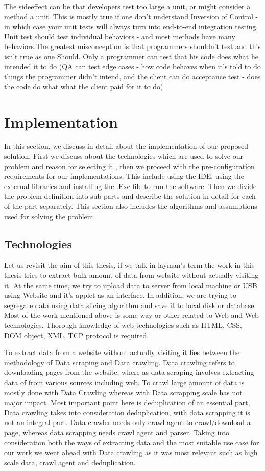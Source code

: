 \documentclass[article,type=msc,colorback,accentcolor=tud9c,twoside,11pt]{tudthesis}
\begin{document}
The sideeffect can be that developers test too large a unit, or might consider a method a unit. This is mostly true if one don't understand Inversion of Control - in which case your unit tests will always turn into end-to-end integration testing. Unit test should test individual behaviors - and most methods have many behaviors.The greatest misconception is that programmers shouldn't test and this isn't true as one Should. Only a programmer can test that his code does what he intended it to do (QA can test edge cases - how code behaves when it's told to do things the programmer didn't intend, and the client can do acceptance test - does the code do what what the client paid for it to do)


\clearpage

\section{Implementation}
In this section, we discuss in detail about the implementation of our proposed solution. First we discuss about the technologies which are used to solve our problem and reason for selecting it , then we proceed with the pre-configuration requirements for our implementations. This include using the IDE, using the external libraries and installing the .Exe file to run the software. Then we divide the problem definition into sub parts and describe the solution in detail for each of the part separately. This section also includes the algorithms and assumptions used for solving the problem.

\subsection{Technologies}
Let us revisit the aim of this thesis, if we talk in layman's term the work in this thesis tries to extract bulk amount of data from website without actually visiting it. At the same time, we try to upload data to server from local machine or USB using Website and it's applet as an interface. In addition, we are trying to segregate data using data slicing algorithm and save it to local disk or database. Most of the work mentioned above is some way or other related to Web and Web technologies. Thorough knowledge of web technologies such as HTML, CSS, DOM object, XML, TCP protocol is required.

To extract data from a website without actually visiting it lies between the methodology of Data scraping and Data crawling. Data crawling refers to downloading pages from the website, where as data scraping involves extracting data of from various sources including web. To crawl  large amount of data is mostly done with Data Crawling whereas with Data scrapping scale has not major impact. Most important point here is deduplication of an essential part, Data crawling takes into consideration deduplication, with data scrapping it is not an integral part. Data crawler needs only crawl agent to crawl/download a page, whereas data scrapping needs crawl agent and parser. Taking into consideration both the ways of extracting data and the most suitable use case for our work we went ahead with Data crawling as it was most relevant such as high scale data, crawl agent and deduplication.
\end{document}
